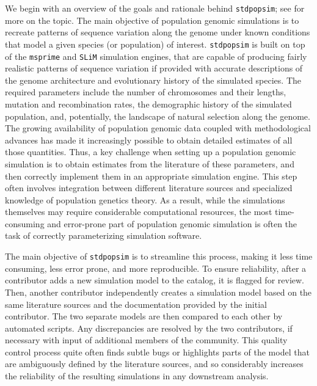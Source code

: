 \documentclass[hidelinks]{article}
\newcommand{\Stdpopsim}{\texttt{Stdpopsim}\xspace}
\newcommand{\stdpopsim}{\texttt{stdpopsim}\xspace}
\begin{document}
We begin with an overview of the goals and rationale behind \stdpopsim;
see \citet{Adrion2020} for more on the topic.
The main objective of population genomic simulations is to recreate 
patterns of sequence variation along the genome under known conditions
that model a given species (or population) of interest.
\stdpopsim is built on top of the
\texttt{msprime} \citep{Kelleher2016,Nelson2020,Baumdicker2022}
and \texttt{SLiM} \citep{Haller2019} simulation engines,
that are capable of producing fairly realistic patterns of sequence variation
if provided with accurate descriptions of the genome architecture
and evolutionary history of the simulated species.
The required parameters include the number of chromosomes and their lengths,
mutation and recombination rates, the demographic history of the simulated population,
and, potentially, the landscape of natural selection along the genome.
The growing availability of population genomic data coupled with methodological advances
has made it increasingly possible to obtain detailed estimates of all those quantities.
Thus, a key challenge when setting up a population genomic simulation is to
obtain estimates from the literature of these parameters,
and then correctly implement them in an appropriate simulation engine.
This step often involves integration between different literature sources and
specialized knowledge of population genetics theory.
As a result, while the simulations themselves may require considerable computational resources,
the most time-consuming and error-prone part of population genomic simulation is
often the task of correctly parameterizing simulation software.

The main objective of \stdpopsim is to streamline this process,
making it less time consuming, less error prone, and more reproducible.
To ensure reliability,
after a contributor adds a new simulation model to the catalog, it is flagged for review.
Then, another contributor independently creates a simulation model
based on the same literature sources and the documentation provided by the initial contributor.
The two separate models are then compared to each other by automated scripts.
Any discrepancies are resolved by the two contributors,
if necessary with input of additional members of the community.
This quality control process quite often finds subtle bugs \citep[e.g., as in][]{Ragsdale2020}
or highlights parts of the model that are ambiguously defined by the literature sources,
and so considerably increases the reliability of the resulting simulations in any downstream analysis.
\end{document}
